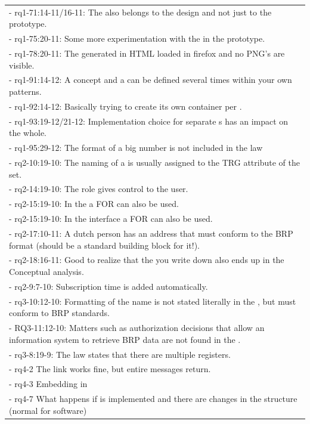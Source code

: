 \begin{xltabular}{\textwidth}{|X|}
-	rq1-71:14-11/16-11: The  also belongs to the design and not just to the prototype.	\\
-	rq1-75:20-11: Some more experimentation with the  in the prototype.	\\
-	rq1-78:20-11: The  generated in HTML loaded in firefox and no PNG's are visible.	\\
-	rq1-91:14-12: A {concept} and a  can be defined several times within your own patterns.	\\
-	rq1-92:14-12: Basically trying to create its own container per .	\\
-	rq1-93:19-12/21-12: Implementation choice for separate s has an impact on the whole.	\\
-	rq1-95:29-12: The format of a  big number is not included in the law	\\
-	rq2-10:19-10: The naming of a  is usually assigned to the TRG attribute of the set.	\\
-	rq2-14:19-10: The role gives control to the user.	\\
-	rq2-15:19-10: In the  a FOR can also be used.	\\
-	rq2-15:19-10: In the {interface} a FOR can also be used.	\\
-	rq2-17:10-11: A dutch person has an  address that must conform to the BRP format (should be a standard building block for it!).	\\
-	rq2-18:16-11: Good to realize that the  you write down also ends up in the {Conceptual analysis}.	\\
-	rq2-9:7-10: Subscription time is added automatically.	\\
-	rq3-10:12-10: Formatting of the name is not stated literally in the , but must conform to BRP standards.	\\
-	RQ3-11:12-10: Matters such as authorization decisions that allow an information system to retrieve BRP data are not found in the .	\\
-	rq3-8:19-9: The law states that there are multiple registers.	\\
-	rq4-2 The  link works fine, but entire messages return.	\\
-	rq4-3 Embedding in 	\\
-	rq4-7 What happens if  is implemented and there are changes in the structure (normal for software)	\\

\end{xltabular}
